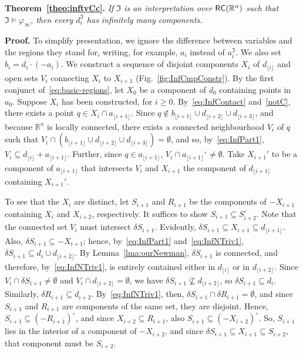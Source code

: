 \documentclass{article}
\newcommand{\R}{\mathbb{R}}
\newcommand{\RC}{{\sf RC}}
\newcommand{\ti}[2][]{{#2}^{\circ_{#1}}}
\newcommand{\md}[2][] {{\lfloor#2\rfloor_{#1}}}
\newcommand{\qedsymbol}{\ding{113}}
\newenvironment{proof}{\par\noindent\textbf{Proof.}}{\mbox{}\hfill\qedsymbol\par\bigskip}
\newenvironment{swetheorem}[1]{\par\medskip\noindent\textbf{#1.}\hspace*{0.5em}\em}{\par\smallskip}
\renewcommand{\phi}{\varphi}
\begin{document}
\begin{swetheorem}{Theorem~\ref{theo:inftyCc}}
	If $\mathfrak I$ is an interpretation over $\RC(\R^n)$ such that
	$\mathfrak I \models \phi_\infty$, then every $d_i^\mathfrak{I}$
	has infinitely many components.
\end{swetheorem}
\begin{proof}
To simplify presentation, we ignore the difference  between variables and the regions 
they stand for, writing, for example, $a_i$ instead of $a_i^\mathfrak{I}$. We also set 
$b_i=d_i\cdot(-a_i)$. We construct a sequence of disjoint components $X_i$ of $d_{\md{i}}$ 
and open sets $V_i$ connecting $X_i$ to $X_{i+1}$ (Fig.~\ref{fig:InfCmpConstr}). By the first 
conjunct of~\eqref{eq:basic-regions}, let $X_0$ be a component of $d_0$ containing points in 
$a_0$. Suppose $X_i$ has been constructed, for $i \geq 0$. By~\eqref{eq:InfContact} 
and~\eqref{notC}, there exists a point $q \in X_i \cap a_{\md{i+1}}$. Since 
$q\notin b_{\md{i+1}}\cup d_{\md{i+2}}\cup d_{\md{i+3}}$, and because $\R^n$ is locally connected, 
there exists a connected neighbourhood $V_i$ of $q$ such that 
$V_i\cap (b_{\md{i+1}}\cup d_{\md{i+2}}\cup d_{\md{i+3}})=\emptyset$, and so, 
by~\eqref{eq:InfPart1}, $V_i\subseteq d_{\md{i}}+a_{\md{i+1}}$. Further, since $q\in a_{\md{i+1}}$,
$V_i\cap \ti{a_{\md{i+1}}}\neq \emptyset$. Take $X_{i+1}'$ to be a component of $a_{\md{i+1}}$ that 
intersects $V_i$ and $X_{i+1}$ the component of $d_{\md{i+1}}$ containing $X_{i+1}'$.
	
To see that the $X_i$ are distinct, let $S_{i+1}$ and $R_{i+1}$ be the
components of $-X_{i+1}$ containing $X_i$ and $X_{i+2}$,
respectively. It suffices to show $S_{i+1} \subseteq\ti{S}_{i+2}$.
Note that the connected set $V_i$ must intersect $\delta S_{i+1}$.
Evidently, $\delta S_{i+1} \subseteq X_{i+1} \subseteq d_{\md{i+1}}$.
Also, $\delta S_{i+1} \subseteq -X_{i+1}$; hence,
by~\eqref{eq:InfPart1} and~\eqref{eq:InfNTriv1}, $\delta S_{i+1}
\subseteq d_{i} \cup d_{\md{i+2}}$.  By Lemma~\ref{lma:ourNewman},
$\delta S_{i+1}$ is connected, and therefore, by~\eqref{eq:InfNTriv1},
is entirely contained either in $d_{\md{i}}$ or in
$d_{\md{i+2}}$. Since $V_i \cap \delta S_{i+1} \neq \emptyset$ and
$V_i \cap d_{\md{i+2}} = \emptyset$, we have $\delta S_{i+1} \not
\subseteq d_{\md{i+2}}$, so $\delta S_{i+1} \subseteq d_i$. Similarly,
$\delta R_{i+1}\subseteq d_{i+2}$.  By~\eqref{eq:InfNTriv1}, then,
$\delta S_{i+1} \cap \delta R_{i+1} = \emptyset$, and since $S_{i+1}$
and $R_{i+1}$ are components of the same set, they are
disjoint. Hence, $S_{i+1}\subseteq \ti{(-R_{i+1})}$, and since
$X_{i+2}\subseteq R_{i+1}$, also $S_{i+1}\subseteq
\ti{(-X_{i+2})}$. So, $S_{i+1}$ lies in the interior of
a component of $-X_{i+2}$, and since $\delta S_{i+1}\subseteq
X_{i+1}\subseteq S_{i+2}$, that component must be $S_{i+2}$.
\end{proof}
\end{document}
